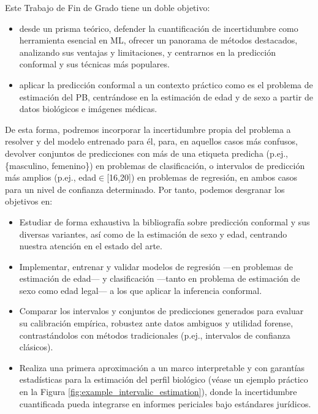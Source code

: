 Este Trabajo de Fin de Grado tiene un doble objetivo: 

\begin{itemize}

    \item desde un prisma teórico, defender la cuantificación de incertidumbre como herramienta esencial en \acrshort{ML}, ofrecer un panorama de métodos destacados, analizando sus ventajas y limitaciones, y centrarnos en la predicción conformal y sus técnicas más populares.

    \item aplicar la predicción conformal a un contexto práctico como es el problema de estimación del \acrshort{PB}, centrándose en la estimación de edad y de sexo a partir de datos biológicos e imágenes médicas.

\end{itemize}

De esta forma, podremos incorporar la incertidumbre propia del problema a resolver y del modelo entrenado para él, para, en aquellos casos más confusos, devolver conjuntos de predicciones con más de una etiqueta predicha (p.ej., \{masculino, femenino\}) en problemas de clasificación, o intervalos de predicción más amplios (p.ej., edad$\in$[16,20]) en problemas de regresión, en ambos casos para un nivel de confianza determinado.
Por tanto, podemos desgranar los objetivos en:

\begin{itemize}

    \item Estudiar de forma exhaustiva la bibliografía sobre predicción conformal y sus diversas variantes, así como de la estimación de sexo y edad, centrando nuestra atención en el estado del arte.

    \item Implementar, entrenar y validar modelos de regresión ---en problemas de estimación de edad--- y clasificación ---tanto en problema de estimación de sexo como edad legal--- a los que aplicar la inferencia conformal.

    \item Comparar los intervalos y conjuntos de predicciones generados para evaluar su calibración empírica, robustez ante datos ambiguos y utilidad forense, contrastándolos con métodos tradicionales (p.ej., intervalos de confianza clásicos).  

    \item Realiza una primera aproximación a un marco interpretable y con garantías estadísticas para la estimación del perfil biológico (véase un ejemplo práctico en la Figura \ref{fig:example_intervalic_estimation}), donde la incertidumbre cuantificada pueda integrarse en informes periciales bajo estándares jurídicos.

\end{itemize}


